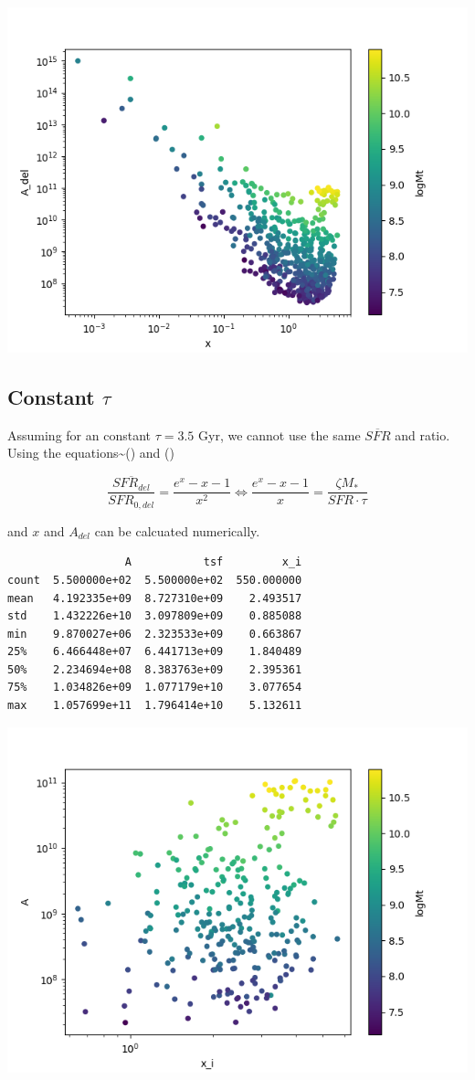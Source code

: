 \documentclass[a4paper]{article}
\begin{document}
\begin{center}
\includegraphics[width=.9\linewidth]{./graphs/x-A_3.png}
\end{center}

\subsection{Constant \(\tau\)}
\label{sec:orgce62d74}
Assuming for an constant \(\tau=3.5\) Gyr, we cannot use the same \(\overline{SFR}\) and ratio. Using the equations\textasciitilde{}() and ()

$$
    \frac{\overline{SFR_{del}}}{SFR_{0,del}}=\frac{e^x-x-1}{x^2}\Leftrightarrow \frac{e^x-x-1}{x}=\frac{\zeta M_*}{SFR\cdot\tau}
$$

and \(x\) and \(A_{del}\) can be calcuated numerically.

\begin{verbatim}
                  A           tsf         x_i
count  5.500000e+02  5.500000e+02  550.000000
mean   4.192335e+09  8.727310e+09    2.493517
std    1.432226e+10  3.097809e+09    0.885088
min    9.870027e+06  2.323533e+09    0.663867
25%    6.466448e+07  6.441713e+09    1.840489
50%    2.234694e+08  8.383763e+09    2.395361
75%    1.034826e+09  1.077179e+10    3.077654
max    1.057699e+11  1.796414e+10    5.132611
\end{verbatim}


\begin{center}
\includegraphics[width=.9\linewidth]{./graphs/x-A_tau.png}
\end{center}
\end{document}
